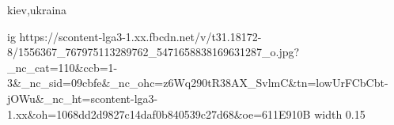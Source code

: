  
 
 
 
 

kiev,ukraina
\par
\ifcmt
  ig https://scontent-lga3-1.xx.fbcdn.net/v/t31.18172-8/1556367_767975113289762_5471658838169631287_o.jpg?_nc_cat=110&ccb=1-3&_nc_sid=09cbfe&_nc_ohc=z6Wq290tR38AX_SvlmC&tn=lowUrFCbCbt-jOWu&_nc_ht=scontent-lga3-1.xx&oh=1068dd2d9827c14daf0b840539c27d68&oe=611E910B
  width 0.15
\fi


